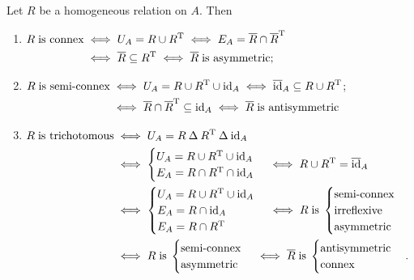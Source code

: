 \begin{lemma}
Let $R$ be a homogeneous relation on $A$. Then
\begin{enumerate}
\item $\begin{aligned}[t]
R \;\text{is connex} &\iff U_A = R\cup R^{\mathrm{T}} \iff E_A = \overline{R}\cap \overline{R}^{\mathrm{T}}\\
&\iff \overline{R}\subseteq R^{\mathrm{T}} \iff \overline{R}\; \text{is asymmetric};
\end{aligned}$
\item $\begin{aligned}[t]
R\; \text{is semi-connex} &\iff U_A = R\cup R^{\mathrm{T}} \cup \operatorname{id}_A \iff \overline{\operatorname{id}}_A\subseteq R\cup R^{\mathrm{T}} \\
&\iff \overline{R}\cap \overline{R}^{\mathrm{T}} \subseteq \operatorname{id}_A \iff \overline{R}\; \text{is antisymmetric}
\end{aligned}$;
\item $\begin{aligned}[t]
R\; \text{is trichotomous} &\iff U_A = R\mathbin{\Delta} R^{\mathrm{T}} \mathbin{\Delta} \operatorname{id}_A \\
&\iff \begin{cases}
U_A = R\cup R^{\mathrm{T}} \cup \operatorname{id}_A \\
E_A = R\cap R^{\mathrm{T}} \cap \operatorname{id}_A
\end{cases} \iff R\cup R^{\mathrm{T}} = \overline{\operatorname{id}}_A \\
&\iff \begin{cases}
U_A = R\cup R^{\mathrm{T}} \cup \operatorname{id}_A \\
E_A = R\cap \operatorname{id}_A \\
E_A = R \cap R^{\mathrm{T}}
\end{cases} \iff R \; \text{is}\;\begin{cases}
\text{semi-connex} \\ \text{irreflexive} \\ \text{asymmetric}
\end{cases} \\
&\iff R \; \text{is}\;\begin{cases}
\text{semi-connex} \\ \text{asymmetric}
\end{cases} \iff \overline{R} \; \text{is}\;\begin{cases}
\text{antisymmetric} \\ \text{connex}
\end{cases}.
\end{aligned}$
\end{enumerate}
\end{lemma}

